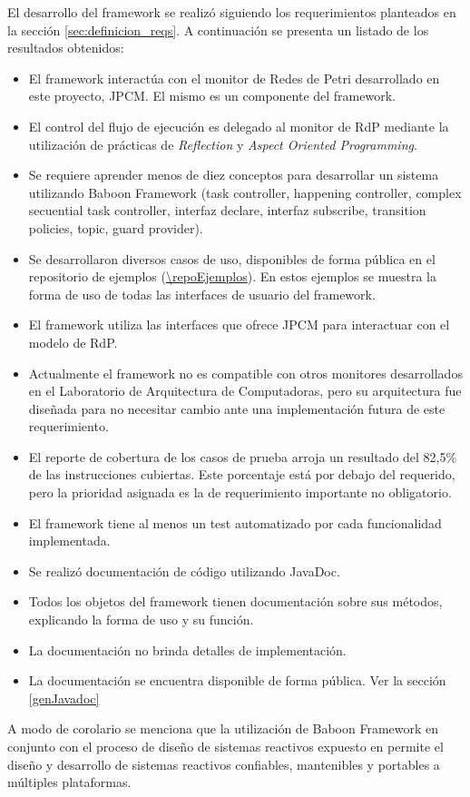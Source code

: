 El desarrollo del framework se realizó siguiendo los requerimientos planteados
en la sección \ref{sec:definicion_reqs}. A continuación se presenta un listado
de los resultados obtenidos:
\begin{itemize}
  \item El framework interactúa con el monitor de Redes de Petri desarrollado en
  este proyecto, JPCM. El mismo es un componente del framework.
  \item El control del flujo de ejecución es delegado al monitor de RdP
  mediante la utilización de prácticas de \textit{Reflection} y \textit{Aspect
  Oriented Programming}.
  \item Se requiere aprender menos de diez conceptos para desarrollar un
  sistema utilizando Baboon Framework (task controller, happening
  controller, complex secuential task controller, interfaz declare, interfaz subscribe, transition policies, topic,
  guard provider).
  \item Se desarrollaron diversos casos de uso, disponibles de forma pública en
  el repositorio de ejemplos (\url{\repoEjemplos}). En estos ejemplos se muestra
  la forma de uso de todas las interfaces de usuario del framework.
  \item El framework utiliza las interfaces que ofrece JPCM para interactuar con
  el modelo de RdP.
  \item Actualmente el framework no es compatible con otros monitores
  desarrollados en el Laboratorio de Arquitectura de Computadoras, pero su
  arquitectura fue diseñada para no necesitar cambio ante una implementación
  futura de este requerimiento.
  \item El reporte de cobertura de los casos de prueba arroja un resultado del
  82,5\% de las instrucciones cubiertas. Este porcentaje está por debajo del requerido,
  pero la prioridad asignada es la de requerimiento importante no obligatorio.
  \item El framework tiene al menos un test automatizado por cada funcionalidad
  implementada.
  \item Se realizó documentación de código utilizando JavaDoc.
  \item Todos los objetos del framework tienen documentación sobre sus métodos,
  explicando la forma de uso y su función.
  \item La documentación no brinda detalles de implementación.
  \item La documentación se encuentra disponible de forma pública. Ver la
  sección \ref{genJavadoc}
\end{itemize}

A modo de corolario se menciona que la utilización de Baboon Framework
en conjunto con el proceso de diseño de sistemas reactivos expuesto en
\cite{Bentivegna-Ludemann} permite el diseño y desarrollo de sistemas reactivos
confiables, mantenibles y portables a múltiples plataformas.
